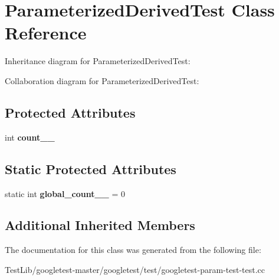 \hypertarget{classParameterizedDerivedTest}{}\section{Parameterized\+Derived\+Test Class Reference}
\label{classParameterizedDerivedTest}


Inheritance diagram for Parameterized\+Derived\+Test\+:


Collaboration diagram for Parameterized\+Derived\+Test\+:
\subsection*{Protected Attributes}
\begin{DoxyCompactItemize}
\item 
\mbox{\label{classParameterizedDerivedTest_ad8a2968265e7477c13585d17bbd0492c}} 
int {\bfseries count_\+\_\+}
\end{DoxyCompactItemize}
\subsection*{Static Protected Attributes}
\begin{DoxyCompactItemize}
\item 
\mbox{\label{classParameterizedDerivedTest_ab6c067a099764a9d58b5f2e8ebcb5d0f}} 
static int {\bfseries global\+\_\+count_\+\_\+} = 0
\end{DoxyCompactItemize}
\subsection*{Additional Inherited Members}


The documentation for this class was generated from the following file\+:\begin{DoxyCompactItemize}
\item 
Test\+Lib/googletest-\/master/googletest/test/googletest-\/param-\/test-\/test.\+cc\end{DoxyCompactItemize}

